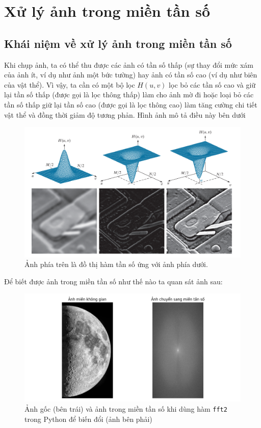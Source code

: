 \documentclass[12pt,a4paper]{report}
\numberwithin{equation}{section}
\theoremstyle{definition} %
\begin{document}
\section{Xử lý ảnh trong miền tần số}
\subsection{Khái niệm về xử lý ảnh trong miền tần số}
Khi chụp ảnh, ta có thể thu được các ảnh có tần số thấp (sự thay đổi mức xám của ảnh ít, ví dụ như ảnh một bức tường) hay ảnh có tần số cao (ví dụ như biên của vật thể). Vì vậy, ta cần có một bộ lọc $H(u,v)$ lọc bỏ các tần số cao và giữ lại tần số thấp (được gọi là lọc thông thấp) làm cho ảnh mờ đi hoặc loại bỏ các tần số thấp giữ lại tần số cao (được gọi là lọc thông cao) làm tăng cường chi tiết vật thể và đồng thời giảm độ tương phản. Hình ảnh mô tả điều này bên dưới

\begin{figure}[H]
	\centering
	\includegraphics[width=15cm]{img/highpassLowpassDemo.png}
	\caption{Ảnh phía trên là đồ thị hàm tần số ứng với ảnh phía dưới.}
\end{figure}
Để biết được ảnh trong miền tần số như thế nào ta quan sát ảnh sau: 
\begin{figure}[H]
	\centering
	\includegraphics[width=15cm]{img/moonFrequencydomain.png}
	\captionsetup{justification=centering}
	\caption{Ảnh gốc (bên trái) và ảnh trong miền tần số khi dùng hàm \texttt{fft2} trong Python để biến đổi (ảnh bên phải) }
\end{figure}
\end{document}

